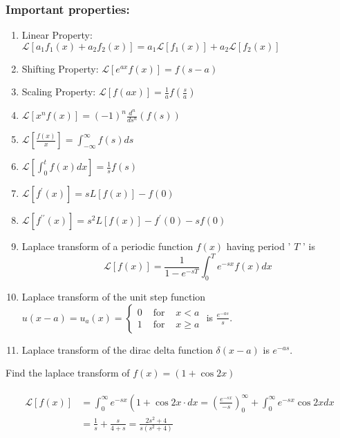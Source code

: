 \subsubsection{Important properties:}
\begin{enumerate}
	\item Linear Property: $\mathcal{L}\left[a_{1} f_{1}(x)+a_{2} f_{2}(x)\right]=a_{1} \mathcal{L}\left[f_{1}(x)\right]+a_{2} \mathcal{L}\left[f_{2}(x)\right]$
	\item Shifting Property: $\mathcal{L}\left[e^{a x} f(x)\right]=f(s-a)$
	\item Scaling Property: $\mathcal{L}[f(a x)]=\frac{1}{a} f\left(\frac{s}{a}\right)$
	\item $\mathcal{L}\left[x^{n} f(x)\right]=(-1)^{n} \frac{d^{n}}{d s^{n}}(f(s))$
	\item $\mathcal{L}\left[\frac{f(x)}{x}\right]=\int_{-\infty}^{\infty} f(s) d s$
	\item $\mathcal{L}\left[\int_{0}^{t} f(x) d x\right]=\frac{1}{s} f(s)$
	\item $\mathcal{L}\left[f^{\prime}(x)\right]=s L[f(x)]-f(0)$
	\item  $\mathcal{L}\left[f^{\prime \prime}(x)\right]=s^{2} L[f(x)]-f^{\prime}(0)-s f(0)$
	\item Laplace transform of a periodic function $f(x)$ having period ' $T$ ' is $$\mathcal{L}[f({x})]=\frac{1}{1-e^{-s T}} \int_{0}^{T} e^{-s x} f({x}) d {x}$$
	\item Laplace transform of the unit step function $u(x-a)=u_{a}(x)=\left\{\begin{array}{lll}0 & \text { for } & x<a \\ 1 & \text { for } & x \geq a\end{array}\right.$ is $\frac{e^{-a s}}{s}$.
	\item Laplace transform of the dirac delta function $\delta(x-a)$ is $e^{-a s}$.
\end{enumerate}
\begin{exercise}
	Find the laplace transform of $f(x)=(1+\cos 2 x)$
\end{exercise}
\begin{answer}
	\begin{align*}
	\begin{aligned}
	\mathcal{L}[f(x)] &=\int_{0}^{\infty} e^{-s x}\left(1+\cos 2 x \cdot d x=\left(\frac{e^{-s x}}{-s}\right)_{0}^{\infty}+\int_{0}^{\infty} e^{-s x} \cos 2 x d x\right.\\
	&=\frac{1}{s}+\frac{s}{4+s}=\frac{2 s^{2}+4}{s\left(s^{2}+4\right)}
	\end{aligned}
	\end{align*}
\end{answer}
